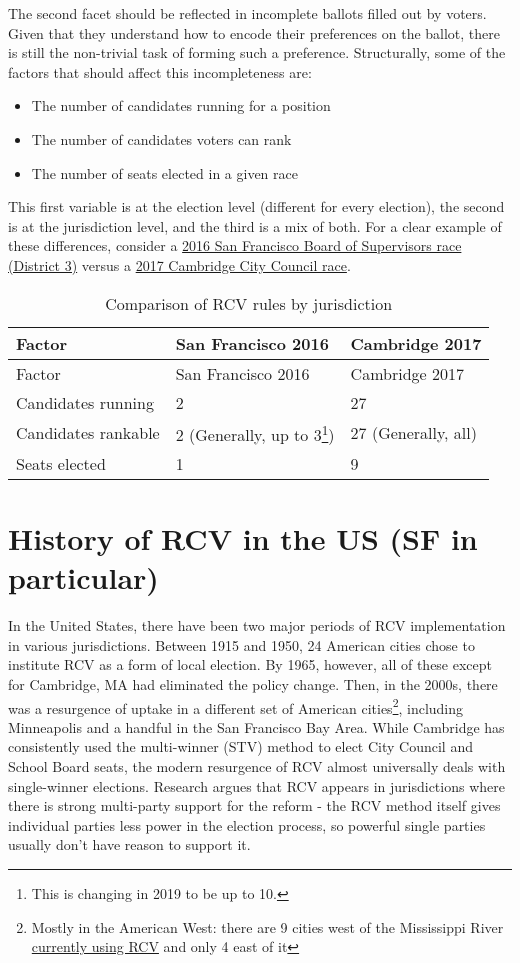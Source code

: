 \documentclass[12pt,twoside]{reedthesis}
\theoremstyle{definition}
\theoremstyle{definition}
\theoremstyle{definition}
\theoremstyle{remark}
\begin{document}
The second facet should be reflected in incomplete ballots filled out by
voters. Given that they understand how to encode their preferences on
the ballot, there is still the non-trivial task of forming such a
preference. Structurally, some of the factors that should affect this
incompleteness are:
\begin{itemize}
\item
  The number of candidates running for a position
\item
  The number of candidates voters can rank
\item
  The number of seats elected in a given race
\end{itemize}
This first variable is at the election level (different for every
election), the second is at the jurisdiction level, and the third is a
mix of both. For a clear example of these differences, consider a
\href{https://sfelections.org/results/20161108/data/20161206/d3/20161206_d3.pdf}{2016
San Francisco Board of Supervisors race (District 3)} versus a
\href{https://www.cambridgema.gov/election2017/Council\%20Order\%20Round.htm}{2017
Cambridge City Council race}.
\begin{longtable}[]{@{}lll@{}}
\caption{Comparison of RCV rules by jurisdiction}\tabularnewline
\toprule
Factor & San Francisco 2016 & Cambridge 2017\tabularnewline
\midrule
\endfirsthead
\toprule
Factor & San Francisco 2016 & Cambridge 2017\tabularnewline
\midrule
\endhead
Candidates running & 2 & 27\tabularnewline
Candidates rankable & 2 (Generally, up to 3\footnote{This is changing in
  2019 to be up to 10.}) & 27 (Generally, all)\tabularnewline
Seats elected & 1 & 9\tabularnewline
\bottomrule
\end{longtable}
\hypertarget{history-of-rcv-in-the-us-sf-in-particular}{%
\section{History of RCV in the US (SF in
particular)}\label{history-of-rcv-in-the-us-sf-in-particular}}

In the United States, there have been two major periods of RCV
implementation in various jurisdictions. Between 1915 and 1950, 24
American cities chose to institute RCV as a form of local election. By
1965, however, all of these except for Cambridge, MA had eliminated the
policy change. Then, in the 2000s, there was a resurgence of uptake in a
different set of American cities\footnote{Mostly in the American West:
  there are 9 cities west of the Mississippi River
  \href{https://www.fairvote.org/where_is_ranked_choice_voting_used}{currently
  using RCV} and only 4 east of it}, including Minneapolis and a handful
in the San Francisco Bay Area. While Cambridge has consistently used the
multi-winner (STV) method to elect City Council and School Board seats,
the modern resurgence of RCV almost universally deals with single-winner
elections. Research argues that RCV appears in jurisdictions where there
is strong multi-party support for the reform - the RCV method itself
gives individual parties less power in the election process, so powerful
single parties usually don't have reason to support it.
\end{document}
